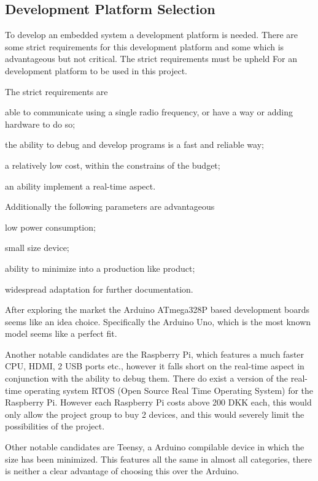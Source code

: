 
\subsection{Development Platform Selection}
To develop an embedded system a development platform is needed. 
There are some strict requirements for this development platform and some which is advantageous but not critical.
The strict requirements must be upheld For an development platform to be used in this project.

The strict requirements are 
\begin{inparaenum}
\item able to communicate using a single radio frequency, or have a way or adding hardware to do so;
\item the ability to debug and develop programs is a fast and reliable way;
\item a relatively low cost, within the constrains of the budget;
\item an ability implement a real-time aspect.
\end{inparaenum}


Additionally the following parameters are advantageous
\begin{inparaenum}
\item low power consumption;
\item small size device;
\item ability to minimize into a production like product;
\item widespread adaptation for further documentation.
\end{inparaenum}

After exploring the market the Arduino ATmega328P based development boards seems like an idea choice.
Specifically the Arduino Uno, which is the most known model seems like a perfect fit.

Another notable candidates are the Raspberry Pi, which features a much faster CPU, HDMI, 2 USB ports etc., however it falls short on the real-time aspect in conjunction with the ability to debug them. 
There do exist a version of the real-time operating system RTOS (Open Source Real Time Operating System) for the Raspberry Pi.
However each Raspberry Pi costs above 200 DKK each, this would only allow the project group to buy 2 devices, and this would severely limit the possibilities of the project.

Other notable candidates are Teensy, a Arduino compilable device in which the size has been minimized.
This features all the same in almost all categories, there is neither a clear advantage of choosing this over the Arduino. 

